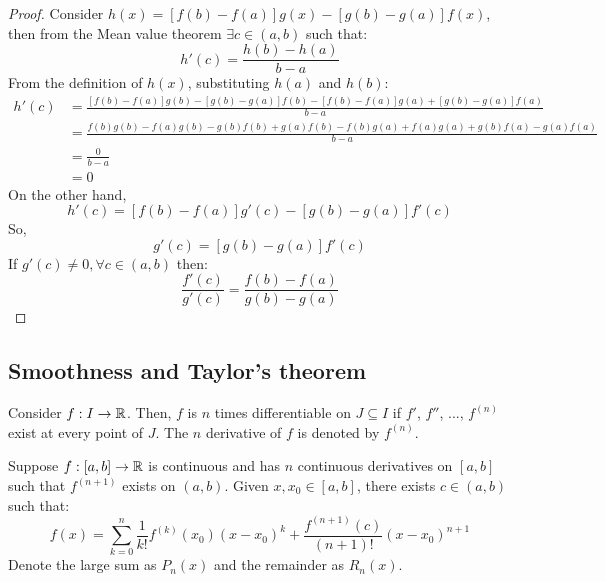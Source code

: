 \begin{proof}
    Consider $h(x) = [f(b) - f(a)]g(x) - [g(b) - g(a)]f(x)$, then from the Mean value theorem $\exists c \in (a,b)$ such that:
    \begin{equation*}
        h'(c) = \frac{h(b) - h(a)}{b-a}
    \end{equation*}
    From the definition of $h(x)$, substituting $h(a)$ and $h(b)$:
    \begin{align*}
        h'(c) &= \frac{[f(b) - f(a)]g(b) - [g(b) - g(a)]f(b) - [f(b) - f(a)]g(a) + [g(b) - g(a)]f(a)}{b-a} \\
        &= \frac{f(b)g(b) - f(a)g(b) - g(b)f(b) + g(a)f(b) - f(b)g(a) + f(a)g(a) + g(b)f(a) - g(a)f(a)}{b-a} \\
        &= \frac{0}{b-a} \\
        &= 0
    \end{align*}
    On the other hand,
    \begin{equation*}
        h'(c) = [f(b) - f(a)]g'(c) - [g(b) - g(a)]f'(c)
    \end{equation*}
    So,
    \begin{equation*}
        [f(b) - f(a)]g'(c) = [g(b) - g(a)]f'(c)
    \end{equation*}
    If $g'(c) \neq 0, \forall c \in (a,b)$ then:
    \begin{equation*}
        \frac{f'(c)}{g'(c)} = \frac{f(b) - f(a)}{g(b) - g(a)}
    \end{equation*}
\end{proof}

\subsection{Smoothness and Taylor's theorem}

\begin{definition}
    Consider $f: I \to \mathbb{R}$. Then, $f$ is $n$ times differentiable on $J \subseteq I$ if $f'$, $f''$, ..., $f^{(n)}$ exist at every point of $J$. The $n$ derivative of $f$ is denoted by $f^(n)$.
\end{definition}

\begin{theorem}
    Suppose $f: [a,b] \to \mathbb{R}$ is continuous and has $n$ continuous derivatives on $[a,b]$ such that $f^{(n+1)}$ exists on $(a,b)$. Given $x, x_0 \in [a,b]$, there exists $c \in (a,b)$ such that:
    \begin{equation}
        f(x) = \sum \limits_{k = 0}^n \frac{1}{k!}f^{(k)}(x_0)(x-x_0)^k + \frac{f^{(n+1)}(c)}{(n+1)!}(x-x_0)^{n+1}
    \end{equation}
    Denote the large sum as $P_n(x)$ and the remainder as $R_n(x)$.
\end{theorem}


